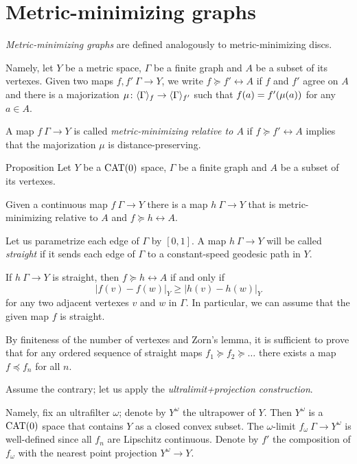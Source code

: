 \section{Metric-minimizing graphs}\label{Metric-minimizing graphs}

\emph{Metric-minimizing graphs} are defined analogously to metric-minimizing discs.

Namely, let $Y$ be a metric space, $\Gamma$ be a finite graph and $A$ be a subset of its vertexes.
Given two maps $f,f'\:\Gamma\to Y$, we write $f\succcurlyeq f'\rel A$ if $f$ and $f'$ agree on $A$ 
and there is a majorization $\mu\colon\langle\Gamma\rangle_f\to \langle\Gamma\rangle_{f'}$
such that $f(a)\zz=f'(\mu(a))$ for any $a\in A$.

A map $f\:\Gamma\to Y$ is called \emph{metric-minimizing relative to $A$} if $f\succcurlyeq f'\rel A$ implies that the majorization $\mu$ is distance-preserving.

\begin{thm}{Proposition}\label{prop:metric-min-graph-exist}
Let $Y$ be a $\mathop{\rm CAT}\nolimits(0)$ space, 
$\Gamma$ be a finite graph and $A$ be a subset of its vertexes.

Given a continuous map $f\:\Gamma\to Y$ there is a map $h\:\Gamma\to Y$ 
that is metric-minimizing relative to $A$ and $f\succcurlyeq h\rel A$.
\end{thm}

Let us parametrize each edge of $\Gamma$ by $[0,1]$.
A map $h\:\Gamma\to Y$ will be called \emph{straight} if it
sends each edge of $\Gamma$ to a constant-speed geodesic path in $Y$.

If $h\:\Gamma\to Y$ is straight, then $f\succcurlyeq h\rel A$ if and only if 
\[|f(v)-f(w)|_Y\ge |h(v)-h(w)|_Y\]
for any two adjacent vertexes $v$ and $w$ in $\Gamma$.
In particular, we can assume that the given map $f$ is straight.

By finiteness of the number of vertexes and Zorn's lemma,
it is sufficient to prove that for any ordered sequence of straight maps $f_1\succcurlyeq f_2\succcurlyeq \dots$ there exists a map $f\preccurlyeq f_n$ for all $n$.

Assume the contrary; let us apply the \emph{ultralimit+projection construction}.

Namely, fix an ultrafilter $\omega$; denote by $Y^\omega$ the ultrapower of $Y$. 
Then $Y^\omega$
is a $\mathop{\rm CAT}\nolimits(0)$ space that contains $Y$ as a closed convex subset. 
The $\omega$-limit $f_\omega\:\Gamma\to Y^\omega$ is well-defined since all $f_n$ are Lipschitz continuous. 
Denote by $f'$ the composition of $f_\omega$ with the nearest point projection $Y^\omega\to Y$.


